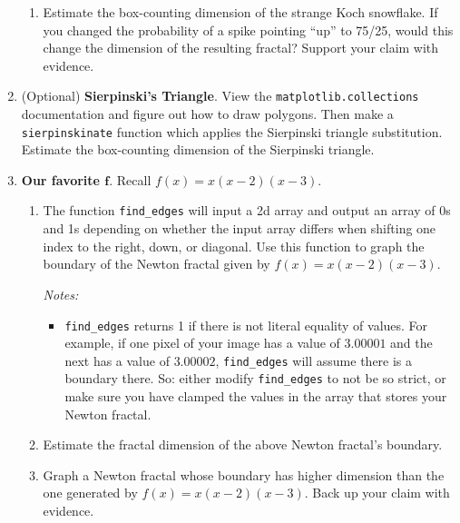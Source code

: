 \documentclass[letter]{article}
\begin{document}
\begin{enumerate}
\begin{enumerate}
				\item Estimate the box-counting dimension of the strange Koch snowflake. If you changed the probability of 
					a spike pointing ``up'' to 75/25, would this change the dimension of the resulting fractal?
					Support your claim with evidence.
			\end{enumerate}
		\item (Optional) {\bf Sierpinski's Triangle}. View the \verb|matplotlib.collections| documentation and figure out
			how to draw polygons. Then make a \verb|sierpinskinate| function which applies the Sierpinski triangle
			substitution. Estimate the box-counting dimension of the Sierpinski triangle.
		\item {\bf Our favorite $\bm f$}. Recall $f(x)=x(x-2)(x-3)$.
			\begin{enumerate}
				\item The function \verb|find_edges| will input a 2d array and output an array of 0s and 1s depending
					on whether the input array differs when shifting one index to the right, down, or diagonal. Use
					this function to graph the boundary of the Newton fractal given by $f(x)=x(x-2)(x-3)$.

					\emph{Notes:}
					\begin{itemize}
						\item \verb|find_edges| returns 1 if there is not literal equality of values. For example,
					if one pixel of your image has a value of $3.00001$ and the next has a value of
							$3.00002$, \verb|find_edges| will assume
					there is a boundary there. So: either modify \verb|find_edges| to not be so strict, or make sure
					you have clamped the values in the array that stores your Newton fractal.
					\end{itemize}
				\item Estimate the fractal dimension of the above Newton fractal's boundary.
				\item Graph a Newton fractal whose boundary has higher dimension than the one generated by $f(x)=x(x-2)(x-3)$.
					Back up your claim with evidence.
			\end{enumerate}
	\end{enumerate}
\end{document}
